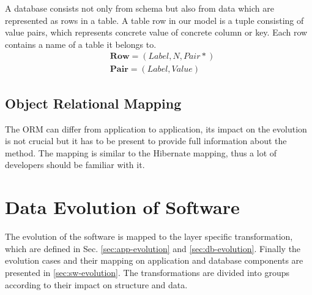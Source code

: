 \documentclass[11pt]{article}
\begin{document}
A database consists not only from schema but also from data which are represented as rows in a table. A table row in our model is a tuple consisting of value pairs, which represents concrete value of concrete column or key. Each row contains a name of a table it belongs to.
\begin{align*}
&	\mathbf{Row} = (Label, N, Pair*) \\
&	\mathbf{Pair} = (Label, Value) 
\end{align*}


\subsection{Object Relational Mapping}
The ORM can differ from application to application, its impact on the evolution is not crucial but it has to be present to provide full information about the method. The mapping is similar to the Hibernate
mapping, thus a lot of developers should be familiar with it. 

\section{Data Evolution of Software}
\label{sec:evolution}
The evolution of the software is mapped to the layer specific transformation, which are defined in Sec. \ref{sec:app-evolution} and \ref{sec:db-evolution}. Finally the evolution cases and their mapping on application and database components are presented in \ref{sec:sw-evolution}. The transformations are divided into groups according to their impact on structure and data. 

\end{document}
